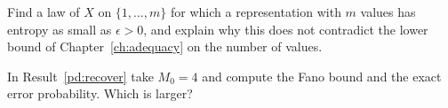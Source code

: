 \begin{exercise}
Find a law of $X$ on $\{1,\dots,m\}$ for which a representation with $m$ values has entropy as small as $\epsilon>0$, and explain why this does not contradict the lower bound of Chapter~\ref{ch:adequacy} on the number of values.
\end{exercise}

\begin{exercise}
In Result~\ref{pd:recover} take $M_0=4$ and compute the Fano bound and the exact error probability. Which is larger?
\end{exercise}
